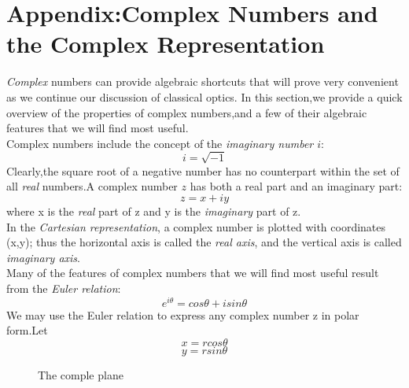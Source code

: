 \documentclass[12pt]{article}
\numberwithin{equation}{section}
\begin{document}
\section{Appendix:Complex Numbers and the Complex Representation}
\emph{Complex} numbers can provide algebraic shortcuts that will prove very convenient as we continue our discussion of classical optics.
In this section,we provide a quick overview of the properties of complex numbers,and a few of their algebraic features that we will find most useful.\\
\indent Complex numbers include the concept of the \emph{imaginary number $i$}:
\begin{equation}
    i=\sqrt{-1}
\end{equation}
Clearly,the square root of a negative number has no counterpart within the set of all \emph{real} numbers.A complex number $z$ has both a real part and an imaginary part:
\begin{equation}
    z=x+iy
\end{equation}
where x is the \emph{real} part of z and y is the \emph{imaginary} part of z.\\
\indent In the \emph{Cartesian representation}, a complex number is plotted with coordinates (x,y);
thus the horizontal axis is called the \emph{real axis}, and the vertical axis is called \emph{imaginary axis}.\\
\indent Many of the features of complex numbers that we will find most useful result from the \emph{Euler relation}:
\begin{equation}
    e^{i\theta}=cos \theta+isin \theta\label{53}
\end{equation}
We may use the Euler relation to express any complex number z in polar form.Let
\begin{equation}
    x=r cos \theta
\end{equation}
\begin{equation}
    y=r sin \theta
\end{equation}
\begin{figure}
    \centering
    \caption{The comple plane}
\end{figure}
\end{document}
